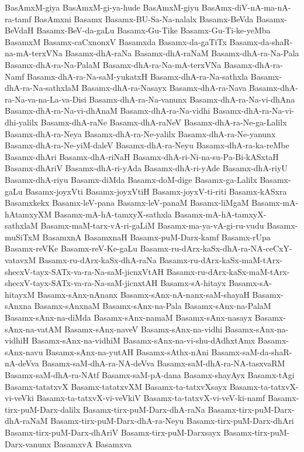 {BasAmxM-giya
BasAmxM-gi-ya-hude
BasAmxM-giyu
BasAmx-diV-nA-ma-nA-ra-tamf
BasAmxni
Basamx
Basamx-BU-Sa-Na-nalalx
Basamx-BeVda
Basamx-BeVdaH
Basamx-BeV-da-gaLu
Basamx-Gu-Tike
Basamx-Gu-Ti-ke-yeMba
BasamxM
Basamx-caCxnonxV
Basamxda
Basamx-da-gaTiTx
Basamx-da-shaR-na-mA-terxVNa
Basamx-dhA-raNa
Basamx-dhA-raNaM
Basamx-dhA-ra-Na-Pala
Basamx-dhA-ra-Na-PalaM
Basamx-dhA-ra-Na-mA-terxVNa
Basamx-dhA-ra-Namf
Basamx-dhA-ra-Na-saM-yukatxH
Basamx-dhA-ra-Na-sathxla
Basamx-dhA-ra-Na-sathxlaM
Basamx-dhA-ra-Nasayx
Basamx-dhA-ra-Nava
Basamx-dhA-ra-Na-va-na-La-va-Disi
Basamx-dhA-ra-Na-vanunx
Basamx-dhA-ra-Na-vi-dhAna
Basamx-dhA-ra-Na-vi-dhAnaM
Basamx-dhA-ra-Na-vidhi
Basamx-dhA-ra-Na-vi-dhi-yalilx
Basamx-dhA-raNe
Basamx-dhA-raNeV
Basamx-dhA-ra-Ne-ga-Lalilx
Basamx-dhA-ra-Neya
Basamx-dhA-ra-Ne-yalilx
Basamx-dhA-ra-Ne-yanunx
Basamx-dhA-ra-Ne-yiM-daleV
Basamx-dhA-ra-Neyu
Basamx-dhA-ra-ka-reMbe
Basamx-dhAri
Basamx-dhA-riNaH
Basamx-dhA-ri-Ni-na-su-Pa-Bi-kASxtaH
Basamx-dhAriV
Basamx-dhA-ri-yAda
Basamx-dhA-ri-yAde
Basamx-dhA-riyU
Basamx-dhA-riyu
Basamx-diMda
Basamx-doM-dige
Basamx-ga-Lalilx
Basamx-gaLu
Basamx-joyxVti
Basamx-joyxVtiH
Basamx-joyxV-ti-riti
Basamx-kASxra
Basamxkekx
Basamx-leV-pana
Basamx-leV-panaM
Basamx-liMgaM
Basamx-mA-hAtamxyXM
Basamx-mA-hA-tamxyX-sathxla
Basamx-mA-hA-tamxyX-sathxlaM
Basamx-maM-tarx-vA-ri-gaLiM
Basamx-ma-ya-vA-gi-ru-vudu
Basamx-muSiTxM
BasamxnA
BasamxnaH
Basamx-puM-Darx-kamf
Basamx-rUpa
Basamx-reVKe
Basamx-reV-Ke-gaLu
Basamx-ru-dArx-kaSx-dhA-ra-NA-ceCxY-vatavxM
Basamx-ru-dArx-kaSx-dhA-raNa
Basamx-ru-dArx-kaSx-maM-tArx-shecxV-tayx-SATx-va-ra-Na-saM-jicnxVtAH
Basamx-ru-dArx-kaSx-maM-tArx-shecxV-tayx-SATx-va-ra-Na-saM-jicnxtAH
Basamx-sA-hitayx
Basamx-sA-hitayxM
Basamx-sAnx-nAnanx
Basamx-sAnx-nA-nanx-saM-shayaH
Basamx-sAnxna
Basamx-sAnxnaM
Basamx-sAnx-na-Pala
Basamx-sAnx-na-PalaM
Basamx-sAnx-na-diMda
Basamx-sAnx-namaM
Basamx-sAnx-nasayx
Basamx-sAnx-na-vatAM
Basamx-sAnx-naveV
Basamx-sAnx-na-vidhi
Basamx-sAnx-na-vidhiH
Basamx-sAnx-na-vidhiM
Basamx-sAnx-na-vi-shu-dAdhxtAmx
Basamx-sAnx-navu
Basamx-sAnx-na-yutAH
Basamx-sAthx-nAni
Basamx-saM-da-shaR-nA-deVva
Basamx-saM-dhA-ra-NA-deVva
Basamx-saM-dhA-ra-NA-tasxvaRM
Basamx-saM-dhA-ra-NAtf
Basamx-saM-pA-dana
Basamx-shayAyx
Basamx-tAgi
Basamx-tatatxvX
Basamx-tatatxvXM
Basamx-ta-tatxvXsayx
Basamx-ta-tatxvX-vi-veVki
Basamx-ta-tatxvX-vi-veVkiV
Basamx-ta-tatxvX-vi-veV-ki-namf
Basamx-tirx-puM-Darx-dalilx
Basamx-tirx-puM-Darx-dhA-raNa
Basamx-tirx-puM-Darx-dhA-raNaM
Basamx-tirx-puM-Darx-dhA-ra-Neyu
Basamx-tirx-puM-Darx-dhAri
Basamx-tirx-puM-Darx-dhAriV
Basamx-tirx-puM-Darxsayx
Basamx-tirx-puM-Darx-vanunx
BasamxvA
Basamxva
}
